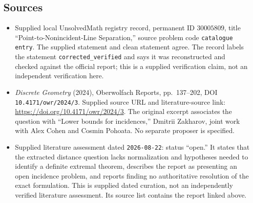 \documentclass[11pt]{article}
\begin{document}
\subsection{Sources}
\begin{itemize}
\item Supplied local UnsolvedMath registry record, permanent ID \(30005809\), title ``Point-to-Nonincident-Line Separation,'' source problem code \texttt{catalogue entry}. The supplied statement and clean statement agree. The record labels the statement \texttt{corrected\_verified} and says it was reconstructed and checked against the official report; this is a supplied verification claim, not an independent verification here.
\item \emph{Discrete Geometry} (2024), Oberwolfach Reports, pp.\ 137--202, DOI \texttt{10.4171/owr/2024/3}. Supplied source URL and literature-source link: \url{https://doi.org/10.4171/owr/2024/3}. The original excerpt associates the question with ``Lower bounds for incidences,'' Dmitrii Zakharov, joint work with Alex Cohen and Cosmin Pohoata. No separate proposer is specified.
\item Supplied literature assessment dated \texttt{2026-08-22}: status ``open.'' It states that the extracted distance question lacks normalization and hypotheses needed to identify a definite extremal theorem, describes the report as presenting an open incidence problem, and reports finding no authoritative resolution of the exact formulation. This is supplied dated curation, not an independently verified literature assessment. Its source list contains the report linked above.
\end{itemize}
\end{document}
